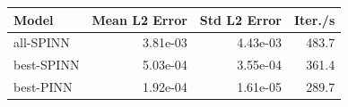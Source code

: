 \begin{tabular}{lrrr}
\toprule
Model & Mean L2 Error & Std L2 Error & Iter./s \\
\midrule
all-SPINN & 3.81e-03 & 4.43e-03 & 483.7 \\
best-SPINN & 5.03e-04 & 3.55e-04 & 361.4 \\
best-PINN & 1.92e-04 & 1.61e-05 & 289.7 \\
\bottomrule
\end{tabular}
